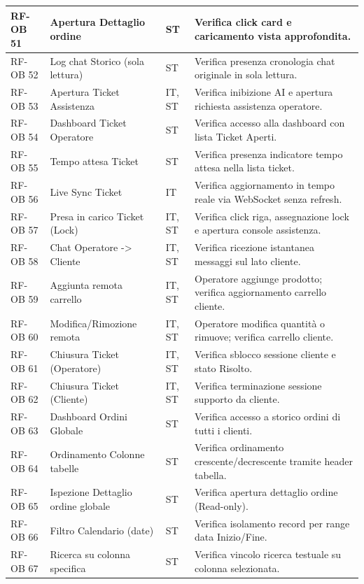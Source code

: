 \documentclass[a4paper,11pt,oneside]{scrartcl}
\begin{document}
\begin{longtable}{|p{1.5cm}|p{4.5cm}|p{1.8cm}|p{6cm}|}
RF-OB 51 & Apertura Dettaglio ordine & ST & Verifica click card e caricamento vista approfondita. \\ \hline
RF-OB 52 & Log chat Storico (sola lettura) & ST & Verifica presenza cronologia chat originale in sola lettura. \\ \hline
RF-OB 53 & Apertura Ticket Assistenza & IT, ST & Verifica inibizione AI e apertura richiesta assistenza operatore. \\ \hline
RF-OB 54 & Dashboard Ticket Operatore & ST & Verifica accesso alla dashboard con lista Ticket Aperti. \\ \hline
RF-OB 55 & Tempo attesa Ticket & ST & Verifica presenza indicatore tempo attesa nella lista ticket. \\ \hline
RF-OB 56 & Live Sync Ticket & IT & Verifica aggiornamento in tempo reale via WebSocket senza refresh. \\ \hline
RF-OB 57 & Presa in carico Ticket (Lock) & IT, ST & Verifica click riga, assegnazione lock e apertura console assistenza. \\ \hline
RF-OB 58 & Chat Operatore -> Cliente & IT, ST & Verifica ricezione istantanea messaggi sul lato cliente. \\ \hline
RF-OB 59 & Aggiunta remota carrello & IT, ST & Operatore aggiunge prodotto; verifica aggiornamento carrello cliente. \\ \hline
RF-OB 60 & Modifica/Rimozione remota & IT, ST & Operatore modifica quantità o rimuove; verifica carrello cliente. \\ \hline
RF-OB 61 & Chiusura Ticket (Operatore) & IT, ST & Verifica sblocco sessione cliente e stato Risolto. \\ \hline
RF-OB 62 & Chiusura Ticket (Cliente) & IT, ST & Verifica terminazione sessione supporto da cliente. \\ \hline
RF-OB 63 & Dashboard Ordini Globale & ST & Verifica accesso a storico ordini di tutti i clienti. \\ \hline
RF-OB 64 & Ordinamento Colonne tabelle & ST & Verifica ordinamento crescente/decrescente tramite header tabella. \\ \hline
RF-OB 65 & Ispezione Dettaglio ordine globale & ST & Verifica apertura dettaglio ordine (Read-only). \\ \hline
RF-OB 66 & Filtro Calendario (date) & ST & Verifica isolamento record per range data Inizio/Fine. \\ \hline
RF-OB 67 & Ricerca su colonna specifica & ST & Verifica vincolo ricerca testuale su colonna selezionata. \\ \hline

\end{longtable}
\end{document}
